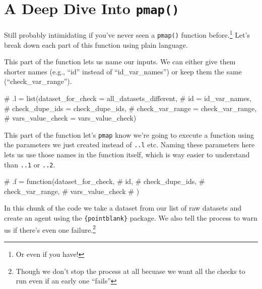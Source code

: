 \documentclass[
  letterpaper,
  DIV=11,
  numbers=noendperiod]{scrreprt}
\newenvironment{Shaded}{\begin{snugshade}}{\end{snugshade}}
\newcommand{\CommentTok}[1]{\textcolor[rgb]{0.37,0.37,0.37}{#1}}
\begin{document}
\hypertarget{a-deep-dive-into-pmap}{%
\section{\texorpdfstring{A Deep Dive Into
\texttt{pmap()}}{A Deep Dive Into pmap()}}\label{a-deep-dive-into-pmap}}

Still probably intimidating if you've never seen a \texttt{pmap()}
function before.\footnote{Or even if you have!} Let's break down each
part of this function using plain language.

This part of the function lets us name our inputs. We can either give
them shorter names (e.g., ``id'' instead of ``id\_var\_names'') or keep
them the same (``check\_var\_range'').

\begin{Shaded}
\begin{Highlighting}[]
\CommentTok{\# .l = list(dataset\_for\_check = all\_datasets\_different,}
\CommentTok{\#           id = id\_var\_names,}
\CommentTok{\#           check\_dupe\_ids = check\_dupe\_ids, }
\CommentTok{\#           check\_var\_range = check\_var\_range,}
\CommentTok{\#           vars\_value\_check = vars\_value\_check)}
\end{Highlighting}
\end{Shaded}

This part of the function let's \texttt{pmap} know we're going to
execute a function using the parameters we just created instead of
\texttt{..l} etc. Naming these parameters here lets us use those names
in the function itself, which is way easier to understand than
\texttt{..1} or \texttt{..2}.

\begin{Shaded}
\begin{Highlighting}[]
\CommentTok{\# .f = function(dataset\_for\_check,}
\CommentTok{\#               id,}
\CommentTok{\#               check\_dupe\_ids,}
\CommentTok{\#               check\_var\_range,}
\CommentTok{\#               vars\_value\_check}
\CommentTok{\#               )}
\end{Highlighting}
\end{Shaded}

In this chunk of the code we take a dataset from our list of raw
datasets and create an agent using the \texttt{\{pointblank\}} package.
We also tell the process to warn us if there's even one
failure.\footnote{Though we don't stop the process at all becuase we
  want all the checks to run even if an early one ``fails''}
\end{document}
